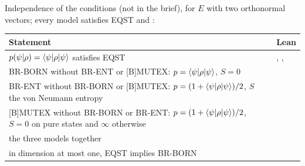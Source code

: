 \documentclass[11pt]{article}
\begin{document}
\noindent Independence of the conditions (not in the brief), for $E$ with two orthonormal
vectors; every model satisfies EQST and :
\begin{center}
\begin{tabularx}{\textwidth}{@{}BL@{}}
\toprule
Statement & Lean \\
\midrule
$p(\psi|\rho) = \braket{\psi|\rho|\psi}$ satisfies EQST & ,
  ,  \\
BR-BORN without BR-ENT or [B]MUTEX: $p = \braket{\psi|\rho|\psi}$, $S = 0$ &
   \\
BR-ENT without BR-BORN or [B]MUTEX: $p = (1 + \braket{\psi|\rho|\psi})/2$, $S$ the von
  Neumann entropy &  \\
{[B]MUTEX} without BR-BORN or BR-ENT: $p = (1 + \braket{\psi|\rho|\psi})/2$, $S = 0$ on pure
  states and $\infty$ otherwise &  \\
the three models together &  \\
in dimension at most one, EQST implies BR-BORN &  \\
\bottomrule
\end{tabularx}
\end{center}
\end{document}
